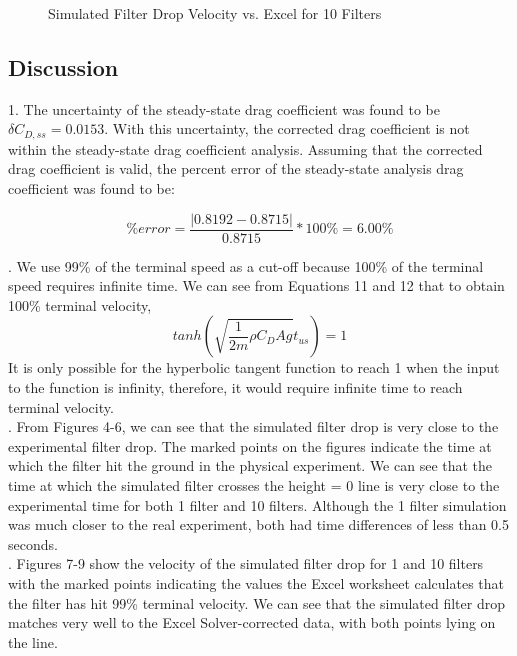 \documentclass[12pt]{report}
\begin{document}
\begin{figure}
	\centering
	\caption{Simulated Filter Drop Velocity vs. Excel for 10 Filters}
	\label{fig:filterdropsimvel10}
\end{figure}

\newpage
\subsection*{Discussion}

1. The uncertainty of the steady-state drag coefficient was found to be $\delta C_{D,ss} = 0.0153$. With this uncertainty, the corrected drag coefficient is not within the steady-state drag coefficient analysis. Assuming that the corrected drag coefficient is valid, the percent error of the steady-state analysis drag coefficient was found to be:

\begin{equation*}
	\%error = \frac{|0.8192-0.8715|}{0.8715}*100\% = 6.00\%
\end{equation*}


. We use 99\% of the terminal speed as a cut-off because 100\% of the terminal speed requires infinite time. We can see from Equations 11 and 12 that to obtain 100\% terminal velocity, 
\begin{equation}
	tanh(\sqrt{\frac{1}{2m}\rho C_D A g}t_{us}) = 1
\end{equation}
\noindent It is only possible for the hyperbolic tangent function to reach 1 when the input to the function is infinity, therefore, it would require infinite time to reach terminal velocity.\\

. From Figures 4-6, we can see that the simulated filter drop is very close to the experimental filter drop. The marked points on the figures indicate the time at which the filter hit the ground in the physical experiment. We can see that the time at which the simulated filter crosses the height = 0 line is very close to the experimental time for both 1 filter and 10 filters. Although the 1 filter simulation was much closer to the real experiment, both had time differences of less than 0.5 seconds.\\

. Figures 7-9 show the velocity of the simulated filter drop for 1 and 10 filters with the marked points indicating the values the Excel worksheet calculates that the filter has hit 99\% terminal velocity. We can see that the simulated filter drop matches very well to the Excel Solver-corrected data, with both points lying on the line.\\
\end{document}
